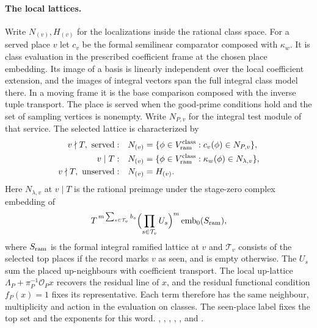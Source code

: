 \paragraph{The local lattices.}
Write \(N_{(v)},H_{(v)}\) for the localizations inside the
rational class space. For a served place \(v\) let \(c_v\) be
the formal semilinear comparator composed with \(\kappa_w\).
It is class evaluation in the prescribed coefficient frame
at the chosen place embedding. Its image of a basis is
linearly independent over the local coefficient extension,
and the images of integral vectors span the full integral
class model there. In a moving frame it is the base
comparison composed with the inverse tuple transport.
The place is served when the good-prime conditions hold and
the set of sampling vertices is nonempty. Write \(N_{P,v}\)
for the integral test module of that service. The selected
lattice is characterized by
\begin{equation}
\label{eq:selected-donor-localizations}
\begin{aligned}
 v\nmid T,\ {\rm served}: &&N_{(v)}
   &=\{\phi\in V_{\rm ram}^{\rm class}:c_v(\phi)\in N_{P,v}\},\\
 v\mid T: &&N_{(v)}
   &=\{\phi\in V_{\rm ram}^{\rm class}:\kappa_w(\phi)\in N_{\lambda,v}\},\\
 v\nmid T,\ {\rm unserved}: &&N_{(v)}&=H_{(v)}.
\end{aligned}
\end{equation}
Here \(N_{\lambda,v}\) at \(v\mid T\) is the rational preimage
under the stage-zero complex embedding of
\[
 T^{\,m\sum_{s\in\mathcal T_v} b_s}
       \Bigl(\prod_{s\in\mathcal T_v} U_s\Bigr)^m
         \operatorname{emb}_0(S_{\rm ram}),
\]
where \(S_{\rm ram}\) is the formal integral ramified lattice
at \(v\) and \(\mathcal T_v\) consists of the selected top
places if the record marks \(v\) as seen, and is empty
otherwise. The \(U_s\) sum the placed up-neighbours with
coefficient transport. The local up-lattice
\(\Lambda_P+\pi_P^{-1}\mathcal O_P x\) recovers the residual
line of \(x\), and the residual functional condition
\(f_P(x)=1\) fixes its representative. Each term therefore
has the same neighbour, multiplicity and action in the
evaluation on classes. The seen-place label fixes the top
set and the exponents for this word.
,
,
,
,
,
 and
.

